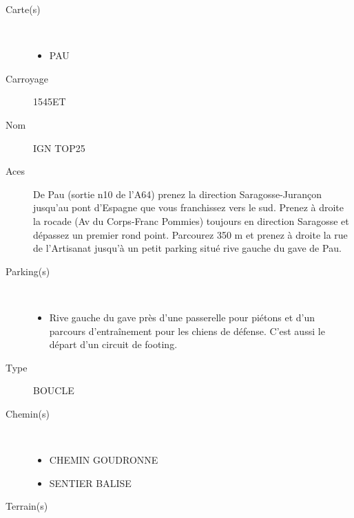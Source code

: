 \documentclass[titlepage]{article}
\begin{document}
        \begin{description}
        
        \item[Carte(s)]~\\{
            \begin{itemize}
            
        \item{PAU}
    
            \end{itemize}
            }
        
            \item[Carroyage]{1545ET}
            \item[Nom]{IGN TOP25}
            \item[Aces]{De Pau (sortie n10 de l'A64) prenez la direction Saragosse-Jurançon jusqu'au pont d'Espagne que vous franchissez vers le sud. Prenez à droite la rocade (Av du Corps-Franc Pommies) toujours en direction Saragosse et dépassez un premier rond point. Parcourez 350 m et prenez à droite la rue de l'Artisanat jusqu'à un petit parking situé rive gauche du gave de Pau.}
        
        \item[Parking(s)]~\\{ 
             \begin{itemize}
             
        \item{Rive gauche du gave près d'une passerelle pour piétons et d'un parcours d'entraînement pour les chiens de défense. C'est aussi le départ d'un circuit de footing.}
    
             \end{itemize}
             }
        
            \item[Type]{BOUCLE}
        
        \item[Chemin(s)]~\\{
            \begin{itemize} 
            
        \item{CHEMIN GOUDRONNE}
    
        \item{SENTIER BALISE}
    
            \end{itemize}
            }
            
            \item[Terrain(s)]~\\{
            \begin{itemize}
            

\end{itemize}}
\end{description}
\end{document}
